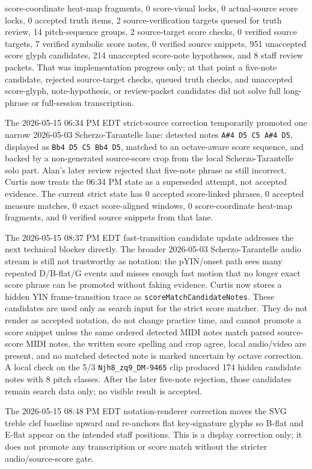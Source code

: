 \documentclass[12pt,letterpaper]{article}
\begin{document}
score-coordinate heat-map fragments, 0 score-visual locks, 0 actual-source score locks, 0 accepted truth items, 2 source-verification targets queued for truth review, 14 pitch-sequence groups, 2 source-target score checks, 0 verified source targets, 7 verified symbolic score notes, 0 verified source snippets, 951 unaccepted score glyph candidates, 214 unaccepted score-note hypotheses, and 8 staff review packets. That was implementation progress only; at that point a five-note candidate, rejected source-target checks, queued truth checks, and unaccepted score-glyph, note-hypothesis, or review-packet candidates did not solve full long-phrase or full-session transcription.

The 2026-05-15 06:34 PM EDT strict-source correction temporarily promoted one narrow 2026-05-03 Scherzo-Tarantelle lane: detected notes \texttt{A\#4 D5 C5 A\#4 D5}, displayed as \texttt{Bb4 D5 C5 Bb4 D5}, matched to an octave-aware score sequence, and backed by a non-generated source-score crop from the local Scherzo-Tarantelle solo part. Alan's later review rejected that five-note phrase as still incorrect. Curtis now treats the 06:34 PM state as a superseded attempt, not accepted evidence. The current strict state has 0 accepted score-linked phrases, 0 accepted measure matches, 0 exact score-aligned windows, 0 score-coordinate heat-map fragments, and 0 verified source snippets from that lane.

The 2026-05-15 08:37 PM EDT fast-transition candidate update addresses the next technical blocker directly. The broader 2026-05-03 Scherzo-Tarantelle audio stream is still not trustworthy as notation: the pYIN/onset path sees many repeated D/B-flat/G events and misses enough fast motion that no longer exact score phrase can be promoted without faking evidence. Curtis now stores a hidden YIN frame-transition trace as \texttt{scoreMatchCandidateNotes}. These candidates are used only as search input for the strict score matcher. They do not render as accepted notation, do not change practice time, and cannot promote a score snippet unless the same ordered detected MIDI notes match parsed source-score MIDI notes, the written score spelling and crop agree, local audio/video are present, and no matched detected note is marked uncertain by octave correction. A local check on the 5/3 \texttt{Njh8\_zq9\_DM-9465} clip produced 174 hidden candidate notes with 8 pitch classes. After the later five-note rejection, those candidates remain search data only; no visible result is accepted.

The 2026-05-15 08:48 PM EDT notation-renderer correction moves the SVG treble clef baseline upward and re-anchors flat key-signature glyphs so B-flat and E-flat appear on the intended staff positions. This is a display correction only; it does not promote any transcription or score match without the stricter audio/source-score gate.
\end{document}
